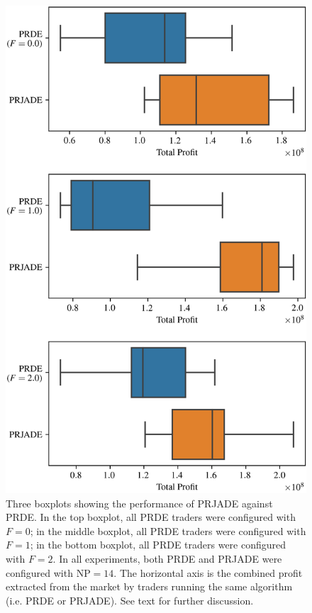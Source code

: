 \documentclass[conference]{IEEEtran}
\begin{document}
\begin{figure}[htbp]
    \centerline{\includegraphics[width=\columnwidth]{prjade_prde_boxplot.png}}
    \caption{
        Three boxplots showing the performance of PRJADE against PRDE.
        In the top boxplot, all PRDE traders were configured with $F=0$; in the middle boxplot, all PRDE traders were configured with $F=1$; in the bottom boxplot, all PRDE traders were configured with $F=2$.
        In all experiments, both PRDE and PRJADE were configured with $\mathrm{NP}=14$.
        The horizontal axis is the combined profit extracted from the market by traders running the same algorithm (i.e. PRDE or PRJADE).
        See text for further discussion.
    }
    \label{prjade_prde_boxplot}
\end{figure}
\end{document}
